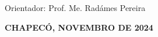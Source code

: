     {
        \hspace*{7cm}
        \begin{minipage}{0.5\textwidth}
            \mdseries
            \SingleSpacing

            Orientador: Prof. Me. Radámes Pereira
        \end{minipage}
    }

    \vfill

    \begin{center}
    \textbf{\MakeTextUppercase{Chapecó, Novembro de 2024}}
    \end{center}